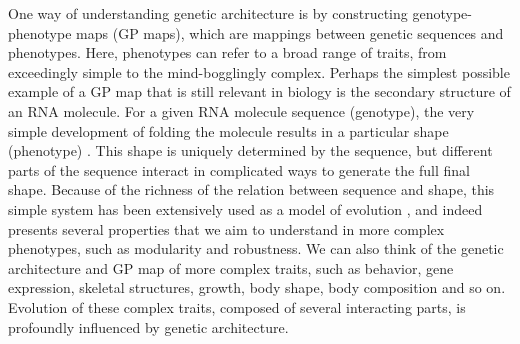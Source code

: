 \begin{refsection}
One way of understanding genetic architecture is by constructing
genotype-phenotype maps (GP maps), which are mappings between genetic sequences and
phenotypes. Here, phenotypes can refer to a broad range of traits, from
exceedingly simple to the mind-bogglingly complex. Perhaps the simplest
possible example of a GP map that is still relevant in biology is the
secondary structure of an RNA molecule. For a given RNA molecule
sequence (genotype), the very simple development of folding the molecule
results in a particular shape (phenotype) \parencite{Ancel2000-vt}. This
shape is uniquely determined by the sequence, but different parts of the
sequence interact in complicated ways to generate the full final shape.
Because of the richness of the relation between sequence and shape, this
simple system has been extensively used as a model of evolution
\parencite{Stadler2006-og}, and indeed presents several properties that we
aim to understand in more complex phenotypes, such as modularity and
robustness. We can also think of the genetic architecture and GP map of
more complex traits, such as behavior, gene expression, skeletal
structures, growth, body shape, body composition and so on. Evolution of
these complex traits, composed of several interacting parts, is
profoundly influenced by genetic architecture.


\end{refsection}
